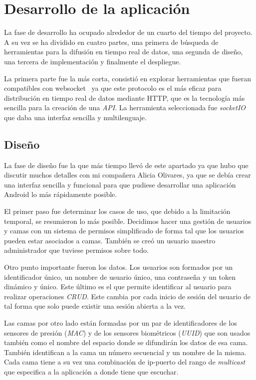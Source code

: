 \section{Desarrollo de la aplicación}
La fase de desarrollo ha ocupado alrededor de un cuarto del tiempo del proyecto. A su vez se ha dividido en cuatro partes, una primera de búsqueda de herramientas para la difusión en tiempo real de datos, una segunda de diseño, una tercera de implementación y finalmente el despliegue.

La primera parte fue la más corta, consistió en explorar herramientas que fueran compatibles con websocket~\cite{wiki:websocket} ya que este protocolo es el más eficaz para distribución en tiempo real de datos mediante HTTP, que es la tecnología más sencilla para la creación de una \textit{API}. La herramienta seleccionada fue \textit{socketIO}~\cite{tool:socketio} que daba una interfaz sencilla y multilenguaje.

\subsection{Diseño}
La fase de diseño fue la que más tiempo llevó de este apartado ya que hubo que discutir muchos detalles con mi compañera Alicia Olivares, ya que se debía crear una interfaz sencilla y funcional para que pudiese desarrollar una aplicación Android lo más rápidamente posible.

El primer paso fue determinar los casos de uso, que debido a la limitación temporal, se resumieron lo más posible. Decidimos hacer una gestión de usuarios y camas con un sistema de permisos simplificado de forma tal que los usuarios pueden estar asociados a camas. También se creó un usuario maestro administrador que tuviese permisos sobre todo.

Otro punto importante fueron los datos. Los usuarios son formados por un identificador único, un nombre de usuario único, una contraseña y un token dinámico y único. Este último es el que permite identificar al usuario para realizar operaciones \textit{CRUD}. Este cambia por cada inicio de sesión del usuario de tal forma que solo puede existir una sesión abierta a la vez.

Las camas por otro lado están formadas por un par de identificadores de los sensores de presión (\textit{MAC}) y de los sensores biométricos (\textit{UUID}) que son usados también como el nombre del espacio donde se difundirán los datos de esa cama. También identifican a la cama un número secuencial y un nombre de la misma. Cada cama tiene a su vez una combinación de ip-puerto del rango de \textit{multicast} que especifica a la aplicación a donde tiene que escuchar. 

